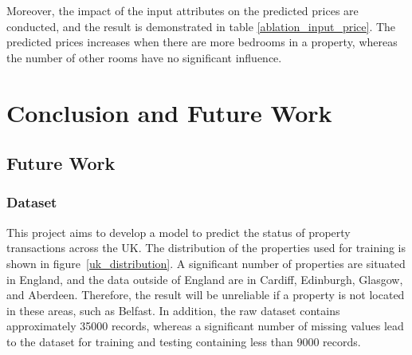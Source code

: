 \documentclass[12pt,twoside]{report}
\begin{document}
Moreover, the impact of the input attributes on the predicted prices are conducted, and the result is demonstrated in table \ref{ablation_input_price}. The predicted prices increases when there are more bedrooms in a property, whereas the number of other rooms have no significant influence. 

\begin{table}[!htbp]
	\centering
	\caption{Impact of modifying inputs on price}
	\label{ablation_input_price}
	\hfill
\end{table}

\chapter{Conclusion and Future Work}
\section{Future Work}
\subsection{Dataset}
This project aims to develop a model to predict the status of property transactions across the UK. The distribution of the properties used for training is shown in \mbox{figure \ref{uk_distribution}}. A significant number of properties are situated in England, and the data outside of England are in Cardiff, Edinburgh, Glasgow, and Aberdeen. Therefore, the result will be unreliable if a property is not located in these areas, such as Belfast. In addition, the raw dataset contains approximately 35000 records, whereas a significant number of missing values lead to the dataset for training and testing containing less than 9000 records.
\\
\end{document}
